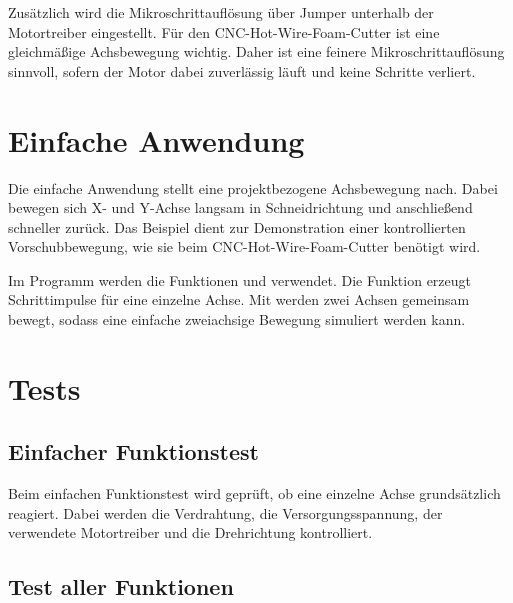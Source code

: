 Zusätzlich wird die Mikroschrittauflösung über Jumper unterhalb der Motortreiber eingestellt. Für den CNC-Hot-Wire-Foam-Cutter ist eine gleichmäßige Achsbewegung wichtig. Daher ist eine feinere Mikroschrittauflösung sinnvoll, sofern der Motor dabei zuverlässig läuft und keine Schritte verliert.

\section{Einfache Anwendung}

Die einfache Anwendung stellt eine projektbezogene Achsbewegung nach. Dabei bewegen sich X- und Y-Achse langsam in Schneidrichtung und anschließend schneller zurück. Das Beispiel dient zur Demonstration einer kontrollierten Vorschubbewegung, wie sie beim CNC-Hot-Wire-Foam-Cutter benötigt wird.

Im Programm werden die Funktionen  und  verwendet. Die Funktion  erzeugt Schrittimpulse für eine einzelne Achse. Mit  werden zwei Achsen gemeinsam bewegt, sodass eine einfache zweiachsige Bewegung simuliert werden kann.

{
	\label{Code:CNCShieldAxisDemo}
}

\section{Tests}

\subsection{Einfacher Funktionstest}

Beim einfachen Funktionstest wird geprüft, ob eine einzelne Achse grundsätzlich reagiert. Dabei werden die Verdrahtung, die Versorgungsspannung, der verwendete Motortreiber und die Drehrichtung kontrolliert.

{
	\label{Code:CNCShieldSimpleStep}
}

\subsection{Test aller Funktionen}

